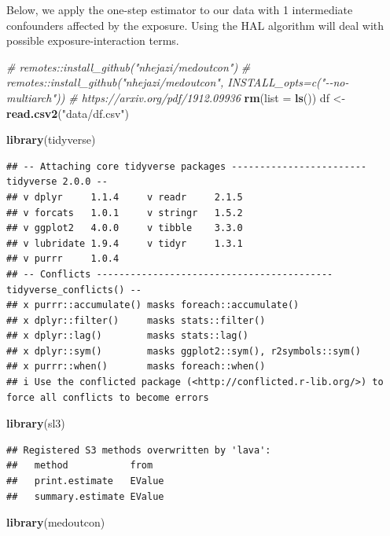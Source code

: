 \documentclass[
]{book}
\newenvironment{Shaded}{\begin{snugshade}}{\end{snugshade}}
\newcommand{\AttributeTok}[1]{\textcolor[rgb]{0.13,0.29,0.53}{#1}}
\newcommand{\CommentTok}[1]{\textcolor[rgb]{0.56,0.35,0.01}{\textit{#1}}}
\newcommand{\FunctionTok}[1]{\textcolor[rgb]{0.13,0.29,0.53}{\textbf{#1}}}
\newcommand{\NormalTok}[1]{#1}
\newcommand{\OtherTok}[1]{\textcolor[rgb]{0.56,0.35,0.01}{#1}}
\newcommand{\StringTok}[1]{\textcolor[rgb]{0.31,0.60,0.02}{#1}}
\begin{document}
Below, we apply the one-step estimator to our data with 1 intermediate confounders affected by the exposure. Using the HAL algorithm will deal with possible exposure-interaction terms.

\begin{Shaded}
\begin{Highlighting}[]
\CommentTok{\# remotes::install\_github("nhejazi/medoutcon")}
\CommentTok{\# remotes::install\_github("nhejazi/medoutcon", INSTALL\_opts=c("{-}{-}no{-}multiarch"))}
\CommentTok{\# https://arxiv.org/pdf/1912.09936}
\FunctionTok{rm}\NormalTok{(}\AttributeTok{list =} \FunctionTok{ls}\NormalTok{())}
\NormalTok{df }\OtherTok{\textless{}{-}} \FunctionTok{read.csv2}\NormalTok{(}\StringTok{"data/df.csv"}\NormalTok{)}

\FunctionTok{library}\NormalTok{(tidyverse)}
\end{Highlighting}
\end{Shaded}

\begin{verbatim}
## -- Attaching core tidyverse packages ------------------------ tidyverse 2.0.0 --
## v dplyr     1.1.4     v readr     2.1.5
## v forcats   1.0.1     v stringr   1.5.2
## v ggplot2   4.0.0     v tibble    3.3.0
## v lubridate 1.9.4     v tidyr     1.3.1
## v purrr     1.0.4     
## -- Conflicts ------------------------------------------ tidyverse_conflicts() --
## x purrr::accumulate() masks foreach::accumulate()
## x dplyr::filter()     masks stats::filter()
## x dplyr::lag()        masks stats::lag()
## x dplyr::sym()        masks ggplot2::sym(), r2symbols::sym()
## x purrr::when()       masks foreach::when()
## i Use the conflicted package (<http://conflicted.r-lib.org/>) to force all conflicts to become errors
\end{verbatim}

\begin{Shaded}
\begin{Highlighting}[]
\FunctionTok{library}\NormalTok{(sl3)}
\end{Highlighting}
\end{Shaded}

\begin{verbatim}
## Registered S3 methods overwritten by 'lava':
##   method           from  
##   print.estimate   EValue
##   summary.estimate EValue
\end{verbatim}

\begin{Shaded}
\begin{Highlighting}[]
\FunctionTok{library}\NormalTok{(medoutcon)}
\end{Highlighting}
\end{Shaded}
\end{document}
